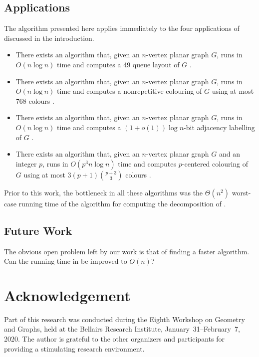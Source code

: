 \documentclass[kpfonts]{patmorin}
\begin{document}
\subsection{Applications}

The algorithm presented here applies immediately to the four applications of  discussed in the introduction.

\begin{itemize}
  \item There exists an algorithm that, given an $n$-vertex planar graph $G$, runs in $O(n\log n)$ time and computes a 49 queue layout of $G$ \cite{dujmovic.joret.ea:planar}.

  \item There exists an algorithm that, given an $n$-vertex planar graph $G$, runs in $O(n\log n)$ time and computes a nonrepetitive colouring of $G$ using at most 768 colours \cite{dujmovic.esperet.ea:planar}.

  \item There exists an algorithm that, given an $n$-vertex planar graph $G$, runs in $O(n\log n)$ time and computes a $(1+o(1))\log n$-bit adjacency labelling of $G$ \cite{dujmovic.esperet.ea:adjacency}.

  \item There exists an algorithm that, given an $n$-vertex planar graph $G$ and an integer $p$, runs in $O(p^3n\log n)$ time and computes $p$-centered colouring of $G$ using at most $3(p+1)\binom{p+3}{3}$ colours \cite{debski.felsner.ea:improved}.

\end{itemize}

Prior to this work, the bottleneck in all these algorithms was the $\Theta(n^2)$ worst-case running time of the algorithm for computing the decomposition of .

\subsection{Future Work}

The obvious open problem left by our work is that of finding a faster algorithm.  Can the running-time in  be improved to $O(n)$?


\section*{Acknowledgement}

Part of this research was conducted during the Eighth Workshop on Geometry and Graphs, held at the Bellairs Research Institute, January~31--February~7, 2020.  The author is grateful to the other organizers and participants for providing a stimulating research environment.
\end{document}
